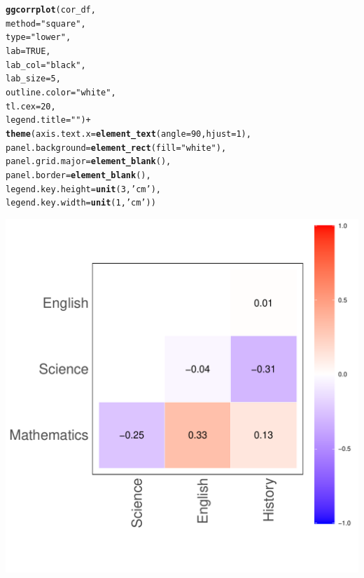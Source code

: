 \documentclass[11pt, a4paper]{article}\usepackage[]{graphicx}\usepackage[]{xcolor}
\makeatletter
\def\maxwidth{ %
  \ifdim\Gin@nat@width>\linewidth
    \linewidth
  \else
    \Gin@nat@width
  \fi
}
\newcommand{\hlnum}[1]{\textcolor[rgb]{0.686,0.059,0.569}{#1}}%
\newcommand{\hlsng}[1]{\textcolor[rgb]{0.192,0.494,0.8}{#1}}%
\newcommand{\hlopt}[1]{\textcolor[rgb]{0,0,0}{#1}}%
\newcommand{\hldef}[1]{\textcolor[rgb]{0.345,0.345,0.345}{#1}}%
\newcommand{\hlkwc}[1]{\textcolor[rgb]{0.333,0.667,0.333}{#1}}%
\newcommand{\hlkwd}[1]{\textcolor[rgb]{0.737,0.353,0.396}{\textbf{#1}}}%
\newenvironment{kframe}{%
 \def\at@end@of@kframe{}%
 \ifinner\ifhmode%
  \def\at@end@of@kframe{\end{minipage}}%
  \begin{minipage}{\columnwidth}%
 \fi\fi%
 \def\FrameCommand##1{\hskip\@totalleftmargin \hskip-\fboxsep
 \colorbox{shadecolor}{##1}\hskip-\fboxsep
     \hskip-\linewidth \hskip-\@totalleftmargin \hskip\columnwidth}%
 \MakeFramed {\advance\hsize-\width
   \@totalleftmargin\z@ \linewidth\hsize
   \@setminipage}}%
 {\par\unskip\endMakeFramed%
 \at@end@of@kframe}
\newenvironment{knitrout}{}{} %
\makeatother
\begin{document}
\begin{knitrout}
\begin{kframe}
\begin{alltt}
\hlkwd{ggcorrplot}\hldef{(cor_df,}
           \hlkwc{method} \hldef{=} \hlsng{"square"}\hldef{,}
           \hlkwc{type} \hldef{=} \hlsng{"lower"}\hldef{,}
           \hlkwc{lab} \hldef{=} \hlnum{TRUE}\hldef{,}
           \hlkwc{lab_col} \hldef{=} \hlsng{"black"}\hldef{,}
           \hlkwc{lab_size} \hldef{=} \hlnum{5}\hldef{,}
           \hlkwc{outline.color} \hldef{=} \hlsng{"white"}\hldef{,}
           \hlkwc{tl.cex} \hldef{=} \hlnum{20}\hldef{,}
           \hlkwc{legend.title} \hldef{=} \hlsng{""}\hldef{)} \hlopt{+}
  \hlkwd{theme}\hldef{(}\hlkwc{axis.text.x} \hldef{=} \hlkwd{element_text}\hldef{(}\hlkwc{angle} \hldef{=} \hlnum{90}\hldef{,} \hlkwc{hjust} \hldef{=} \hlnum{1}\hldef{),}
        \hlkwc{panel.background} \hldef{=} \hlkwd{element_rect}\hldef{(}\hlkwc{fill} \hldef{=} \hlsng{"white"}\hldef{),}
        \hlkwc{panel.grid.major} \hldef{=} \hlkwd{element_blank}\hldef{(),}
        \hlkwc{panel.border} \hldef{=} \hlkwd{element_blank}\hldef{(),}
        \hlkwc{legend.key.height} \hldef{=} \hlkwd{unit}\hldef{(}\hlnum{3}\hldef{,} \hlsng{'cm'}\hldef{),}
        \hlkwc{legend.key.width} \hldef{=} \hlkwd{unit}\hldef{(}\hlnum{1}\hldef{,} \hlsng{'cm'}\hldef{))}
\end{alltt}
\end{kframe}
\includegraphics[width=\maxwidth]{figure/unnamed-chunk-9-1} 
\end{knitrout}
\end{document}
